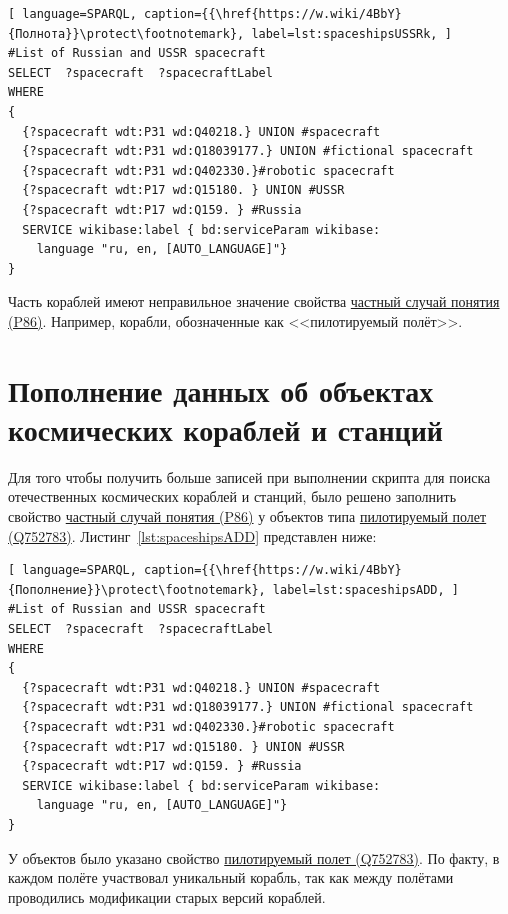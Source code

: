 \begin{lstlisting}[ language=SPARQL, caption={{\href{https://w.wiki/4BbY}{Полнота}}\protect\footnotemark}, label=lst:spaceshipsUSSRk, ]
#List of Russian and USSR spacecraft
SELECT  ?spacecraft  ?spacecraftLabel 
WHERE
{
  {?spacecraft wdt:P31 wd:Q40218.} UNION #spacecraft
  {?spacecraft wdt:P31 wd:Q18039177.} UNION #fictional spacecraft
  {?spacecraft wdt:P31 wd:Q402330.}#robotic spacecraft
  {?spacecraft wdt:P17 wd:Q15180. } UNION #USSR
  {?spacecraft wdt:P17 wd:Q159. } #Russia
  SERVICE wikibase:label { bd:serviceParam wikibase:
    language "ru, en, [AUTO_LANGUAGE]"}
}
\end{lstlisting}

Часть кораблей имеют неправильное значение свойства \href{https://www.wikidata.org/wiki/Property:P86}{частный случай понятия (P86)}. Например, корабли, обозначенные как <<пилотируемый полёт>>.
\section{Пополнение данных об объектах космических кораблей и станций}
Для того чтобы получить больше записей при выполнении скрипта для поиска отечественных космических кораблей и станций, было решено заполнить свойство \href{https://www.wikidata.org/wiki/Property:P86}{частный случай понятия (P86)} у объектов типа \href{https://www.wikidata.org/wiki/Q752783}{пилотируемый полет (Q752783)}. Листинг~\ref{lst:spaceshipsADD} представлен ниже:
\begin{lstlisting}[ language=SPARQL, caption={{\href{https://w.wiki/4BbY}{Пополнение}}\protect\footnotemark}, label=lst:spaceshipsADD, ]
#List of Russian and USSR spacecraft
SELECT  ?spacecraft  ?spacecraftLabel 
WHERE
{
  {?spacecraft wdt:P31 wd:Q40218.} UNION #spacecraft
  {?spacecraft wdt:P31 wd:Q18039177.} UNION #fictional spacecraft
  {?spacecraft wdt:P31 wd:Q402330.}#robotic spacecraft
  {?spacecraft wdt:P17 wd:Q15180. } UNION #USSR
  {?spacecraft wdt:P17 wd:Q159. } #Russia
  SERVICE wikibase:label { bd:serviceParam wikibase:
    language "ru, en, [AUTO_LANGUAGE]"}
}
\end{lstlisting}
У объектов было указано свойство \href{https://www.wikidata.org/wiki/Q752783}{пилотируемый полет (Q752783)}. По факту, в каждом полёте участвовал уникальный корабль, так как между полётами проводились модификации старых версий кораблей.

